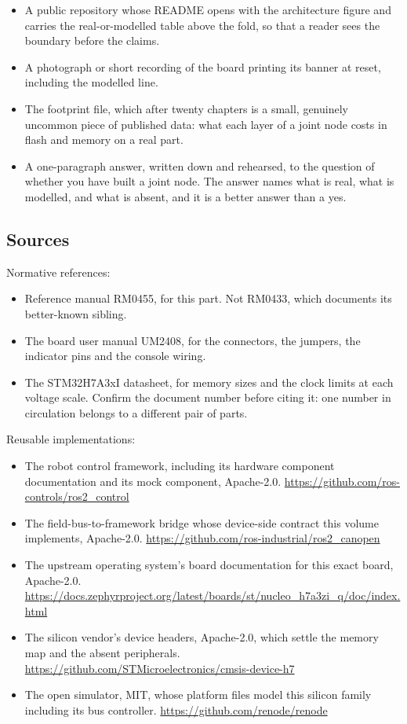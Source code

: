 \begin{itemize}
\item A public repository whose README opens with the architecture figure and
carries the real-or-modelled table above the fold, so that a reader sees the
boundary before the claims.
\item A photograph or short recording of the board printing its banner at reset,
including the modelled line.
\item The footprint file, which after twenty chapters is a small, genuinely
uncommon piece of published data: what each layer of a joint node costs in flash
and memory on a real part.
\item A one-paragraph answer, written down and rehearsed, to the question of
whether you have built a joint node. The answer names what is real, what is
modelled, and what is absent, and it is a better answer than a yes.
\end{itemize}

\subsection*{Sources}

Normative references:
\begin{itemize}
\item Reference manual RM0455, for this part. Not RM0433, which documents its
better-known sibling.
\item The board user manual UM2408, for the connectors, the jumpers, the
indicator pins and the console wiring.
\item The STM32H7A3xI datasheet, for memory sizes and the clock limits at each
voltage scale. Confirm the document number before citing it: one number in
circulation belongs to a different pair of parts.
\end{itemize}

Reusable implementations:
\begin{itemize}
\item The robot control framework, including its hardware component
documentation and its mock component, Apache-2.0.\newline
\url{https://github.com/ros-controls/ros2_control}
\item The field-bus-to-framework bridge whose device-side contract this volume
implements, Apache-2.0.\newline
\url{https://github.com/ros-industrial/ros2_canopen}
\item The upstream operating system's board documentation for this exact board,
Apache-2.0.\newline
\url{https://docs.zephyrproject.org/latest/boards/st/nucleo_h7a3zi_q/doc/index.html}
\item The silicon vendor's device headers, Apache-2.0, which settle the memory
map and the absent peripherals.\newline
\url{https://github.com/STMicroelectronics/cmsis-device-h7}
\item The open simulator, MIT, whose platform files model this silicon family
including its bus controller.\newline
\url{https://github.com/renode/renode}
\end{itemize}
